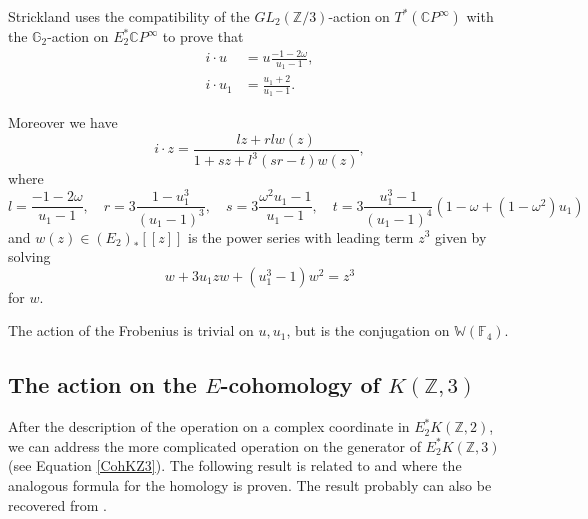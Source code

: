 \documentclass{amsart}
\newcommand {\F}{{\mathbb F}}
\newcommand {\Z}{{\mathbb Z}}
\newcommand {\W}{{\mathbb W}}
\newcommand {\C}{{\mathbb C}}
\newcommand {\G}{{\mathbb G}}
\numberwithin{equation}{section}
\theoremstyle{definition}  %
\newtheorem{set theory}[thm]{Set Theoretic Prelude}
\begin{document}
Strickland  uses the compatibility of the $GL_2(\Z/3)$-action on $T^*(\C P^\infty)$ with the $\G_2$-action on $E_2^*\C P^\infty$
to prove that \cite[Section 2.4]{MR3450774}
\begin{align*}
i\cdot u     &=  u \frac{-1-2\omega}{u_1-1},\\ 
i\cdot u_1 & = \frac{u_1+2}{u_1-1}.
\end{align*}

Moreover we have $$i\cdot z=\frac{lz+rlw(z)}{1+sz+l^3(sr-t)w(z)},$$
where
$$l=\frac{-1-2\omega}{u_1-1},\quad r=3\frac{1-u_1^3}{(u_1-1)^3}, \quad s=3\frac{\omega^2u_1-1}{u_1-1}, \quad 
t=3\frac{u_1^3-1}{(u_1-1)^4}\left(1-\omega+(1-\omega^2)u_1\right)$$
and $w(z)\in(E_2)_*[[z]]$ is the power series with leading term $z^3$ given by solving 
$$w+3u_1zw+(u_1^3-1)w^2=z^3$$
for $w$.


The action of the Frobenius is trivial on $u,u_1$, but is the conjugation on $\W(\F_4)$.

\subsection{The action on the $E$-cohomology of $K(\Z,3)$}

After the description of the operation on a complex coordinate in $E_2^*K(\Z,2)$, we can address the more complicated
operation on the generator of $E_2^*K(\Z,3)$ (see Equation \ref{CohKZ3}). The following result is related to \cite{Pet11}  and \cite[Theorem 3.21]{W13} where the analogous formula for the homology is proven. The result probably can also be recovered from \cite{HL13}.
\end{document}
